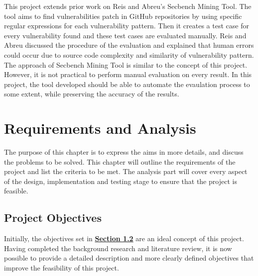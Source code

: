 \documentclass[12pt, a4paper]{report}
\begin{document}
{This project extends prior work on Reis and Abreu's \cite{secbench} Secbench Mining Tool. The tool
aims to find vulnerabilities patch in GitHub repositories by using specific regular expressions for
each vulnerability pattern. Then it creates a test case for every vulnerability found and these test
cases are evaluated manually. Reis and Abreu \cite{reis_2017} discussed the procedure of the
evaluation and explained that human errors could occur due to source code complexity and similarity
of vulnerability pattern. The approach of Secbench Mining Tool is similar to the concept of this
project. However, it is not practical to perform manual evaluation on every result. In this project,
the tool developed should be able to automate the evaulation process to some extent, while
preserving the accuracy of the results.

\chapter{Requirements and Analysis}
The purpose of this chapter is to express the aims in more details, and discuss the problems to be
solved. This chapter will outline the requirements of the project and list the criteria to be met.
The analysis part will cover every aspect of the design, implementation and testing stage to ensure
that the project is feasible.

\section{Project Objectives}
Initially, the objectives set in \hyperref[sec:objectives]{\textbf{Section 1.2}} are an ideal
concept of this project. Having completed the background research and literature review, it is now
possible to provide a detailed description and more clearly defined objectives that improve the
feasibility of this project.

}
\end{document}
